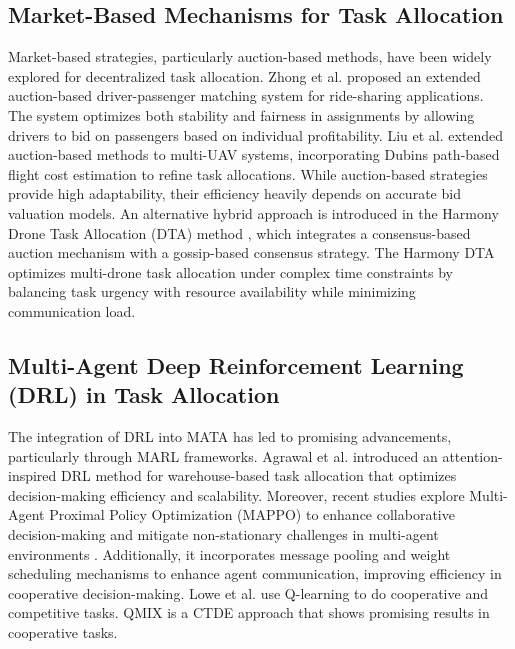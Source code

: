 \subsection{Market-Based Mechanisms for Task Allocation}
Market-based strategies, particularly auction-based methods, have been widely explored for decentralized task allocation. Zhong et al. \cite{zhong2018stable} proposed an extended auction-based driver-passenger matching system for ride-sharing applications. The system optimizes both stability and fairness in assignments by allowing drivers to bid on passengers based on individual profitability. Liu et al. \cite{liu2024multi} extended auction-based methods to multi-UAV systems, incorporating Dubins path-based flight cost estimation to refine task allocations. While auction-based strategies provide high adaptability, their efficiency heavily depends on accurate bid valuation models. An alternative hybrid approach is introduced in the Harmony Drone Task Allocation (DTA) method \cite{harmonyDTA}, which integrates a consensus-based auction mechanism with a gossip-based consensus strategy. The Harmony DTA optimizes multi-drone task allocation under complex time constraints by balancing task urgency with resource availability while minimizing communication load.

\subsection{Multi-Agent Deep Reinforcement Learning (DRL) in Task Allocation}

The integration of DRL into MATA has led to promising advancements, particularly through MARL frameworks. Agrawal et al. \cite{agrawal2023rtaw} introduced an attention-inspired DRL method for warehouse-based task allocation that optimizes decision-making efficiency and scalability. Moreover, recent studies explore Multi-Agent Proximal Policy Optimization (MAPPO) to enhance collaborative decision-making and mitigate non-stationary challenges in multi-agent environments \cite{mappo2023arxiv}. Additionally, it incorporates message pooling and weight scheduling mechanisms to enhance agent communication, improving efficiency in cooperative decision-making. Lowe et al. \cite{lowe2017multi} use Q-learning to do cooperative and competitive tasks. QMIX is a CTDE approach that shows \cite{rashid2018qmix} promising results in cooperative tasks.

